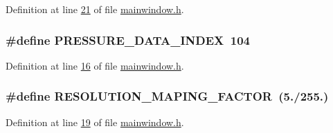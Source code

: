 Definition at line \hyperlink{a00110_source_l00021}{21} of file \hyperlink{a00110_source}{mainwindow.\+h}.

\hypertarget{a00110_a56c4aa163f5d0c550eeb89fdb3f08996}{
\subsubsection[{P\+R\+E\+S\+S\+U\+R\+E\+\_\+\+D\+A\+T\+A\+\_\+\+I\+N\+D\+E\+X}]{\setlength{\rightskip}{0pt plus 5cm}\#define P\+R\+E\+S\+S\+U\+R\+E\+\_\+\+D\+A\+T\+A\+\_\+\+I\+N\+D\+E\+X~104}}\label{a00110_a56c4aa163f5d0c550eeb89fdb3f08996}


Definition at line \hyperlink{a00110_source_l00016}{16} of file \hyperlink{a00110_source}{mainwindow.\+h}.

\hypertarget{a00110_a58055d345f4a971dad22c043135fb214}{
\subsubsection[{R\+E\+S\+O\+L\+U\+T\+I\+O\+N\+\_\+\+M\+A\+P\+I\+N\+G\+\_\+\+F\+A\+C\+T\+O\+R}]{\setlength{\rightskip}{0pt plus 5cm}\#define R\+E\+S\+O\+L\+U\+T\+I\+O\+N\+\_\+\+M\+A\+P\+I\+N\+G\+\_\+\+F\+A\+C\+T\+O\+R~(5./255.)}}\label{a00110_a58055d345f4a971dad22c043135fb214}


Definition at line \hyperlink{a00110_source_l00019}{19} of file \hyperlink{a00110_source}{mainwindow.\+h}.

